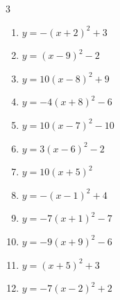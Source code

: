 \begin{multicols}{3}
\begin{enumerate}
  \item $\displaystyle y=-\left( x+2\right)^{2}+3$

        \phantom{$\displaystyle 頂点\left( -2 , 3 \right)$}

  \item $\displaystyle y=\left( x-9\right)^{2}-2$

        \phantom{$\displaystyle 頂点\left( 9 , -2 \right)$}

  \item $\displaystyle y=10\left( x-8\right)^{2}+9$

        \phantom{$\displaystyle 頂点\left( 8 , 9 \right)$}

  \item $\displaystyle y=-4\left( x+8\right)^{2}-6$

        \phantom{$\displaystyle 頂点\left( -8 , -6 \right)$}

  \item $\displaystyle y=10\left( x-7\right)^{2}-10$

        \phantom{$\displaystyle 頂点\left( 7 , -10 \right)$}

  \item $\displaystyle y=3\left( x-6\right)^{2}-2$

        \phantom{$\displaystyle 頂点\left( 6 , -2 \right)$}

  \item $\displaystyle y=10\left( x+5\right)^{2}$

        \phantom{$\displaystyle 頂点\left( -5 , 0 \right)$}

  \item $\displaystyle y=-\left( x-1\right)^{2}+4$

        \phantom{$\displaystyle 頂点\left( 1 , 4 \right)$}

  \item $\displaystyle y=-7\left( x+1\right)^{2}-7$

        \phantom{$\displaystyle 頂点\left( -1 , -7 \right)$}

  \item $\displaystyle y=-9\left( x+9\right)^{2}-6$

        \phantom{$\displaystyle 頂点\left( -9 , -6 \right)$}

  \item $\displaystyle y=\left( x+5\right)^{2}+3$

        \phantom{$\displaystyle 頂点\left( -5 , 3 \right)$}

  \item $\displaystyle y=-7\left( x-2\right)^{2}+2$


\end{enumerate}
\end{multicols}
